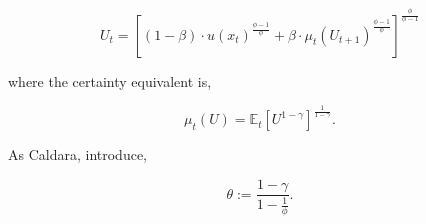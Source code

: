 \documentclass[american]{scrartcl}
\newcommand{\E}{\mathbb{E}}
\begin{document}
\begin{equation}
    U_t = \left[ (1 - \beta) \cdot u(x_t)^{\frac{\phi - 1}{\phi}} + \beta \cdot \mu_t(U_{t+1})^{\frac{\phi - 1}{\phi}} \right]^{\frac{\phi}{\phi - 1}}
\end{equation}

where the certainty equivalent is,

\begin{equation}
    \mu_t(U) = \E_t\left[ U^{1 - \gamma} \right]^{\frac{1}{1 - \gamma}}.
\end{equation}

As Caldara, introduce,

\begin{equation}
    \theta := \frac{1 - \gamma}{1 - \frac{1}{\phi}}.
\end{equation}
\end{document}

